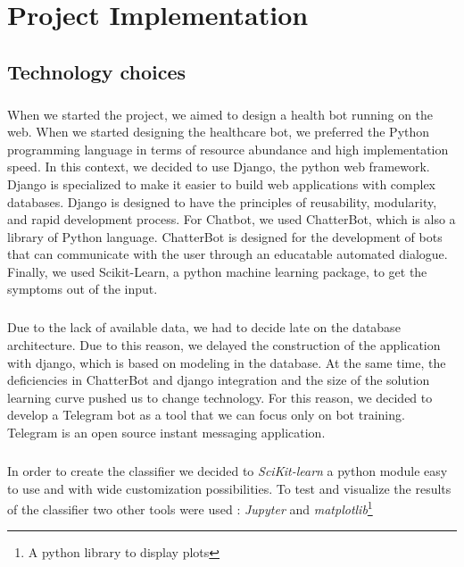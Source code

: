 \chapter{Project Implementation} 

\section{Technology choices}

\paragraph{}
When we	started	the	project,	we	aimed	to	design	a	health	bot	running	on	the	web.	When	we	started	designing	the	healthcare	bot,	we	preferred	the	Python	programming	language	in	 terms	of	resource	abundance	and	high	implementation	speed.	In	this	context,	we	decided	to	use	Django,	the	python	web	framework.	Django	is	specialized	to	make	it	easier	to	build	web	applications	with	complex	databases\cite{bibid}.	Django	is	designed	to	have	the	principles	of	reusability, modularity,	and	rapid	development	process.	For	Chatbot,	we	used	ChatterBot,	which	is	also	a	library	of	Python	language.	ChatterBot	is	designed	for	the	development	of	bots	that	can	communicate	with	the	user	through	an	educatable	automated	dialogue\cite{bibid}.	Finally,	we	used	Scikit-Learn,	a	python	machine	learning	package,	to	get	the	symptoms	out	of	the	input.	
\paragraph{}
Due	to	the	lack	of	available	data,	we	had	to	decide	late	on	the	database	architecture.	Due	to	this	reason,	we	delayed	the	construction	of	the	application	with	django,	which	is	based	on	modeling	in	the	database.	At	the	same	time,	the	deficiencies	in	ChatterBot	and	django	integration	and	the	size	of	the	solution	learning	curve	pushed	us	to	change	technology.	For	this	reason,	we	decided	to	develop	a	Telegram	bot	as	a	tool	that	we	can	focus	only	on	bot	training.	Telegram	is	an	open	source	instant	messaging	application.	

\paragraph{}
In order to create the classifier we decided to \textit{SciKit-learn}\cite{bib:misc:2} a python module easy to use and with wide customization possibilities. To test and visualize the results of the classifier two other tools were used : \textit{Jupyter}\cite{bib:misc:3} and \textit{matplotlib}\footnote{A python library to display plots}

